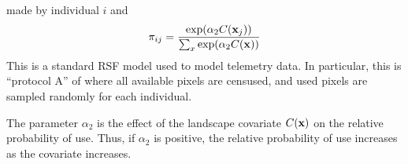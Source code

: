 made by individual $i$ and 
\[
 \pi_{ij} = \frac{ \exp( \alpha_{2} C({\bf x}_{j}) ) }{ \sum_{x}
   \exp(\alpha_{2} C({\bf x}))}
\]
This is a standard RSF model \citep{manly_etal:2002} used to model
telemetry data. In particular, this is ``protocol A'' of
\citep{manly_etal:2002} where all available pixels are censused, and
used pixels are sampled randomly for each individual.

The parameter $\alpha_2$ is the effect of the
landscape covariate $C({\bf x})$ on the relative probability of
use. Thus, if $\alpha_2$ is positive, the relative probability of use
increases as the covariate increases.

